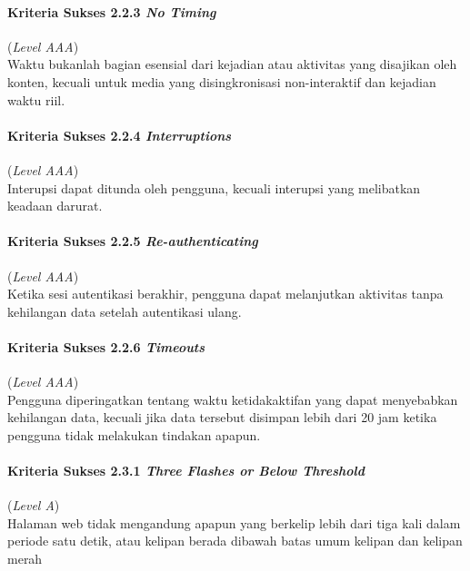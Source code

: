 \paragraph{Kriteria Sukses 2.2.3 \textit{No Timing}}
\label{subsec:kriteria_2.2.3}
(\textit{Level AAA}) \\

Waktu bukanlah bagian esensial dari kejadian atau aktivitas yang disajikan oleh konten, kecuali untuk media yang disingkronisasi non-interaktif dan kejadian waktu riil.

\paragraph{Kriteria Sukses 2.2.4 \textit{Interruptions}}
\label{subsec:kriteria_2.2.4}
(\textit{Level AAA}) \\

Interupsi dapat ditunda oleh pengguna, kecuali interupsi yang melibatkan keadaan darurat.

\paragraph{Kriteria Sukses 2.2.5 \textit{Re-authenticating}}
\label{subsec:kriteria_2.2.5}
(\textit{Level AAA}) \\

Ketika sesi autentikasi berakhir, pengguna dapat melanjutkan aktivitas tanpa kehilangan data setelah autentikasi ulang.

\paragraph{Kriteria Sukses 2.2.6 \textit{Timeouts}}
\label{subsec:kriteria_2.2.6}
(\textit{Level AAA}) \\

Pengguna diperingatkan tentang waktu ketidakaktifan yang dapat menyebabkan kehilangan data, kecuali jika data tersebut disimpan lebih dari 20 jam ketika pengguna tidak melakukan tindakan apapun.

\paragraph{Kriteria Sukses 2.3.1 \textit{Three Flashes or Below Threshold}}
\label{subsec:kriteria_2.3.1}
(\textit{Level A}) \\

Halaman web tidak mengandung apapun yang berkelip lebih dari tiga kali dalam periode satu detik, atau kelipan berada dibawah batas umum kelipan dan kelipan merah

